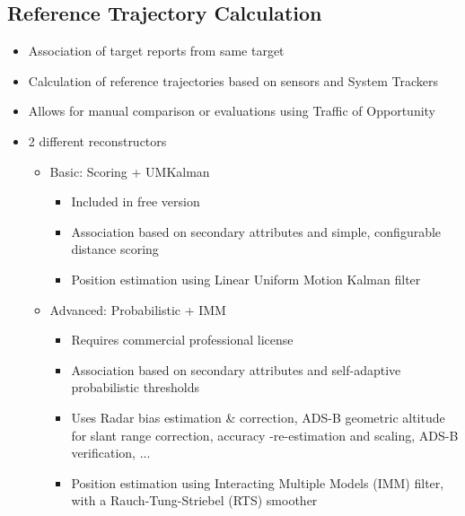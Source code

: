 \subsection{Reference Trajectory Calculation}    
\begin{itemize}  
    \item Association of target reports from same target
    \item Calculation of reference trajectories based on sensors and System Trackers
    \item Allows for manual comparison or evaluations using Traffic of Opportunity
    \item 2 different reconstructors
    \begin{itemize}  
        \item Basic: Scoring + UMKalman
        \begin{itemize}  
            \item Included in free version
            \item Association based on secondary attributes and simple, configurable distance scoring
            \item Position estimation using Linear Uniform Motion Kalman filter
        \end{itemize}  
        \item Advanced: Probabilistic + IMM
        \begin{itemize}  
            \item Requires commercial professional license
            \item Association based on secondary attributes and self-adaptive probabilistic thresholds
            \item Uses Radar bias estimation \& correction, ADS-B geometric altitude for slant range correction, accuracy -re-estimation and scaling, ADS-B verification, ...
            \item Position estimation using Interacting Multiple Models (IMM) filter, with a Rauch-Tung-Striebel (RTS) smoother
        \end{itemize}          
    \end{itemize}  
\end{itemize}


